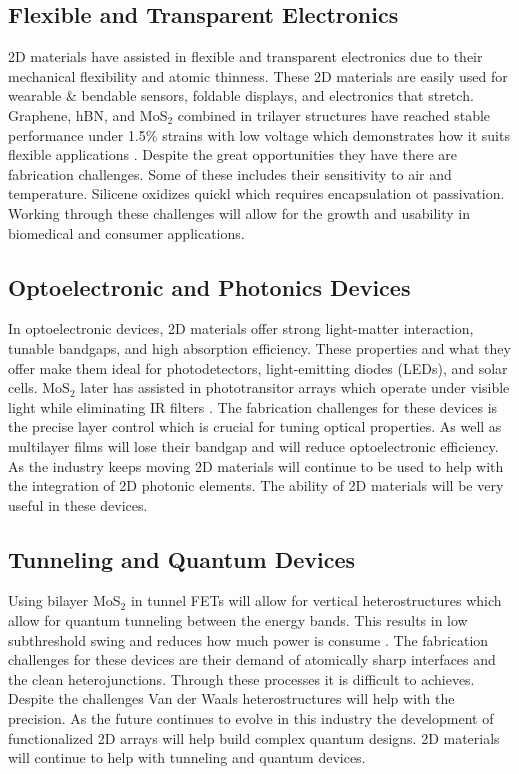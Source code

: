\documentclass[conference]{IEEEtran}
\begin{document}
\subsection{Flexible and Transparent Electronics}

2D materials have assisted in flexible and transparent electronics due to their mechanical flexibility and atomic thinness. These 2D materials are easily used for  wearable & bendable sensors, foldable displays, and electronics that stretch. Graphene, hBN, and MoS$_2$ combined in trilayer structures have reached stable performance under 1.5\% strains with low voltage which demonstrates how it suits flexible applications \cite{ds4} . Despite the great opportunities they have there are fabrication challenges. Some of these includes their sensitivity to air and temperature. Silicene oxidizes quickl which requires encapsulation ot passivation. Working through these challenges will allow for the growth and usability in biomedical and consumer applications.

\subsection{Optoelectronic and Photonics Devices}

In optoelectronic devices, 2D materials offer strong light-matter interaction, tunable bandgaps, and high absorption efficiency. These properties and what they offer make them ideal for photodetectors, light-emitting diodes (LEDs), and solar cells. MoS$_2$ later has assisted in phototransitor arrays which operate under visible light while eliminating IR filters \cite{ds5}. The fabrication challenges for these devices is the precise layer control which is crucial for tuning optical properties. As well as multilayer films will lose their bandgap and will reduce optoelectronic efficiency. As the industry keeps moving 2D materials will continue to be used to help with the integration of 2D photonic elements. The ability of 2D materials will be very useful in these devices.

\subsection{Tunneling and Quantum Devices}

Using bilayer MoS$_2$ in tunnel FETs will allow for vertical heterostructures which allow for quantum tunneling between the energy bands. This results in low subthreshold swing and reduces how much power is consume \cite{ds5}. The fabrication challenges for these devices are their demand of atomically sharp interfaces and the clean heterojunctions. Through these processes it is difficult to achieves. Despite the challenges Van der Waals heterostructures will help with the precision. As the future continues to evolve in this industry the development of functionalized 2D arrays will help build complex quantum designs. 2D materials will continue to help with tunneling and quantum devices.  
\end{document}
